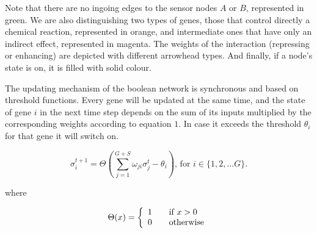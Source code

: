 \documentclass{article}
\begin{document}

Note that there are no ingoing edges to the sensor nodes $A$ or $B$, represented in green. We are also distinguishing two types of genes, those that control directly a 
chemical reaction, represented in orange, and intermediate ones that have only an indirect effect, represented in magenta. The weights of the interaction (repressing or 
enhancing) are depicted with different arrowhead types. And finally, if a node's state is on, it is filled with solid colour.

The updating mechanism of the boolean network is synchronous and based on threshold functions. Every gene will be updated at the same time, and the state of gene $i$ in 
the next time step depends on the sum of its inputs multiplied by the corresponding weights according to equation $1$. In case it exceeds the threshold $\theta_i$ for that 
gene it will switch on.

\begin{equation}
\sigma_i^{t+1} = \Theta(\sum_{j=1}^{G+S}\omega_{ji}\sigma_j^t - \theta_i)\textrm{, for $i \in \{1,2,\ldots G\}$.}
\end{equation}


where

\[
  \Theta(x) = \left\{ 
  \begin{array}{l l}
    1 & \quad \textrm{if $x > 0$} \\
    0 & \quad \textrm{otherwise}
  \end{array} \right.
\]
\end{document}
